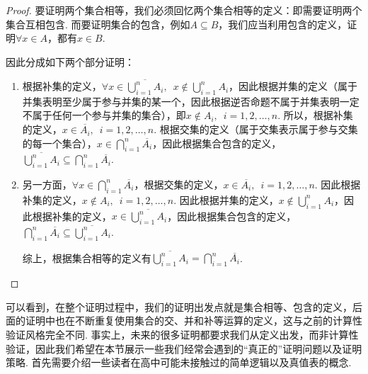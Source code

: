 \begin{proof}
    要证明两个集合相等，我们必须回忆两个集合相等的定义：即需要证明两个集合互相包含. 而要证明集合的包含，例如$A\subseteq B$，我们应当利用包含的定义，证明$\forall x\in A$，都有$x\in B$.

    因此分成如下两个部分证明：
    \begin{enumerate}
        \item 根据补集的定义，$\forall x\in \overline{\displaystyle\bigcup_{i=1}^nA_i},\enspace x\notin \displaystyle\bigcup_{i=1}^nA_i$，因此根据并集的定义（属于并集表明至少属于参与并集的某一个，因此根据逆否命题不属于并集表明一定不属于任何一个参与并集的集合），即$x\notin A_i,\enspace i=1,2,\ldots,n$. 所以，根据补集的定义，$x\in \overline{A_i},\enspace i=1,2,\ldots,n$. 根据交集的定义（属于交集表示属于参与交集的每一个集合），$x\in \displaystyle\bigcap_{i=1}^n\overline{A_i}$，因此根据集合包含的定义，$\overline{\displaystyle\bigcup_{i=1}^nA_i}\subseteq \displaystyle\bigcap_{i=1}^n\overline{A_i}$.

        \item 另一方面，$\forall x\in \displaystyle\bigcap_{i=1}^n\overline{A_i}$，根据交集的定义，$x\in \overline{A_i},\enspace i=1,2,\ldots,n$. 因此根据补集的定义，$x\notin A_i,\enspace i=1,2,\ldots,n$. 因此根据并集的定义，$x\notin \displaystyle\bigcup_{i=1}^nA_i$，因此根据补集的定义，$x\in \overline{\displaystyle\bigcup_{i=1}^nA_i}$，因此根据集合包含的定义，$\displaystyle\bigcap_{i=1}^n\overline{A_i}\subseteq \overline{\bigcup_{i=1}^nA_i}$.

              综上，根据集合相等的定义有$\overline{\displaystyle\bigcup_{i=1}^nA_i}=\displaystyle\bigcap_{i=1}^n\overline{A_i}$.
    \end{enumerate}
\end{proof}

可以看到，在整个证明过程中，我们的证明出发点就是集合相等、包含的定义，后面的证明中也在不断重复使用集合的交、并和补等运算的定义，这与之前的计算性验证风格完全不同. 事实上，未来的很多证明都要求我们从定义出发，而非计算性验证，因此我们希望在本节展示一些我们经常会遇到的``真正的''证明问题以及证明策略. 首先需要介绍一些读者在高中可能未接触过的简单逻辑以及真值表的概念.

